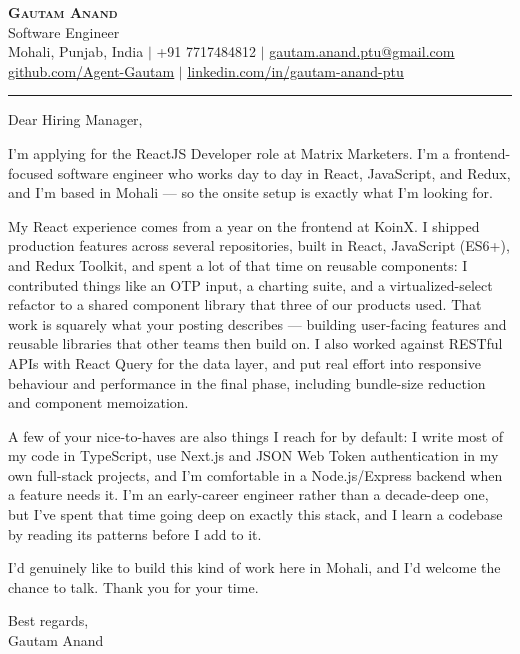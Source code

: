 \documentclass[letterpaper,11pt]{article}
\begin{document}
\begin{center}
    \textbf{\Huge \scshape Gautam Anand} \\ \vspace{2pt}
    \small Software Engineer \\ \vspace{2pt}
    \small Mohali, Punjab, India $|$ +91 7717484812 $|$
    \href{mailto:gautam.anand.ptu@gmail.com}{\underline{gautam.anand.ptu@gmail.com}} \\ \vspace{1pt}
    \small \href{https://github.com/Agent-Gautam}{\underline{github.com/Agent-Gautam}} $|$
    \href{https://www.linkedin.com/in/gautam-anand-ptu}{\underline{linkedin.com/in/gautam-anand-ptu}}
\end{center}

\vspace{6pt}
\hrule
\vspace{10pt}

Dear Hiring Manager,

I'm applying for the ReactJS Developer role at Matrix Marketers. I'm a frontend-focused software engineer who works day to day in React, JavaScript, and Redux, and I'm based in Mohali --- so the onsite setup is exactly what I'm looking for.

My React experience comes from a year on the frontend at KoinX. I shipped production features across several repositories, built in React, JavaScript (ES6+), and Redux Toolkit, and spent a lot of that time on reusable components: I contributed things like an OTP input, a charting suite, and a virtualized-select refactor to a shared component library that three of our products used. That work is squarely what your posting describes --- building user-facing features and reusable libraries that other teams then build on. I also worked against RESTful APIs with React Query for the data layer, and put real effort into responsive behaviour and performance in the final phase, including bundle-size reduction and component memoization.

A few of your nice-to-haves are also things I reach for by default: I write most of my code in TypeScript, use Next.js and JSON Web Token authentication in my own full-stack projects, and I'm comfortable in a Node.js/Express backend when a feature needs it. I'm an early-career engineer rather than a decade-deep one, but I've spent that time going deep on exactly this stack, and I learn a codebase by reading its patterns before I add to it.

I'd genuinely like to build this kind of work here in Mohali, and I'd welcome the chance to talk. Thank you for your time.

\vspace{6pt}

Best regards, \\
Gautam Anand
\end{document}

